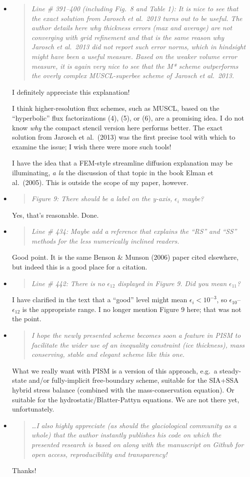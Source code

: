 \documentclass[11pt,reqno]{amsart}
\newcommand{\reply}[2]{
\medskip\medskip
\item  \begin{quote}
\emph{#1}
\end{quote}

\medskip
\noindent #2}
\begin{document}
\begin{itemize}
\reply{Line \# 391--400 (including Fig.~8 and Table 1): It is nice to see that the exact solution from Jarosch et al.~2013 turns out to be useful.  The author details here why thickness errors (max and average) are not converging with grid refinement and that is the same reason why Jarosch et al.~2013 did not report such error norms, which in hindsight might have been a useful measure.  Based on the weaker volume error measure, it is again very nice to see that the M* scheme outperforms the overly complex MUSCL-superbee scheme of Jarosch et al.~2013.}
{I definitely appreciate this explanation!

I think higher-resolution flux schemes, such as MUSCL, based on the ``hyperbolic'' flux factorizations (4), (5), or (6), are a promising idea.  I do not know \emph{why} the compact stencil version here performs better.  The exact solution from Jarosch et al.~(2013) was the first precise tool with which to examine the issue; I wish there were more such tools!

I have the idea that a FEM-style streamline diffusion explanation may be illuminating, \emph{a la} the discussion of that topic in the book Elman et al.~(2005).  This is outside the scope of my paper, however.}

\reply{Figure 9: There should be a label on the y-axis, $\epsilon_i$ maybe?}
{Yes, that's reasonable.  Done.}

\reply{Line \# 434: Maybe add a reference that explains the ``RS'' and ``SS'' methods for the less numerically inclined readers.}
{Good point.  It is the same Benson \& Munson (2006) paper cited elsewhere, but indeed this is a good place for a citation.}

\reply{Line \# 442: There is no $\epsilon_{12}$ displayed in Figure 9.  Did you mean $\epsilon_{11}$?}
{I have clarified in the text that a ``good'' level might mean $\epsilon_i<10^{-3}$, so $\epsilon_{10}$--$\epsilon_{12}$ is the appropriate range.  I no longer mention Figure 9 here; that was not the point.}

\reply{I hope the newly presented scheme becomes soon a feature in PISM to facilitate the wider use of an inequality constraint (ice thickness), mass conserving, stable and elegant scheme like this one.}
{What we really want with PISM is a version of this approach, e.g.~a steady-state and/or fully-implicit free-boundary scheme, suitable for the SIA+SSA hybrid stress balance (combined with the mass-conservation equation).  Or suitable for the hydrostatic/Blatter-Pattyn equations.  We are not there yet, unfortunately.}

\reply{\dots  I also highly appreciate (as should the glaciological community as a whole) that the author instantly publishes his code on which the presented research is based on along with the manuscript on Github for open access, reproducibility and transparency!}
{Thanks!}
\end{itemize}
\end{document}
